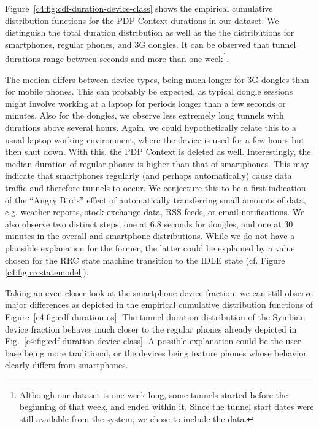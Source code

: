 Figure~\ref{c4:fig:cdf-duration-device-class} shows the empirical cumulative distribution functions for the PDP Context durations in our dataset. We distinguish the total duration distribution as well as the the distributions for smartphones, regular phones, and 3G dongles. It can be observed that tunnel durations range between  seconds and more than one week\footnote{Although our dataset is one week long, some tunnels started before the beginning of that week, and ended within it. Since the tunnel start dates were still available from the system, we chose to include the data.}.

The median differs between device types, being much longer for 3G dongles than for mobile phones. This can probably be expected, as typical dongle sessions might involve working at a laptop for periods longer than a few seconds or minutes. Also for the dongles, we observe less extremely long tunnels with durations above several hours. Again, we could hypothetically relate this to a usual laptop working environment, where the device is used for a few hours but then shut down. With this, the PDP Context is deleted as well. Interestingly, the median duration of regular phones is higher than that of smartphones. This may indicate that  smartphones regularly (and perhaps automatically) cause data traffic and therefore tunnels to occur. We conjecture this to be a first indication of the ``Angry Birds'' effect of automatically transferring small amounts of data, e.g. weather reports, stock exchange data, RSS feeds, or email notifications. We also observe two distinct steps, one at 6.8 seconds for dongles, and one at 30 minutes in the overall and smartphone distributions. While we do not have a plausible explanation for the former, the latter could be explained by a value chosen for the RRC state machine transition to the IDLE state (cf. Figure \ref{c4:fig:rrcstatemodel}).




Taking an even closer look at the smartphone device fraction, we can still observe major differences as depicted in the empirical cumulative distribution functions of Figure~\ref{c4:fig:cdf-duration-os}. The tunnel duration distribution of the Symbian device fraction behaves much closer to the regular phones already depicted in Fig.~\ref{c4:fig:cdf-duration-device-class}. A possible explanation could be the user-base being more traditional, or the devices being feature phones whose behavior clearly differs from smartphones.

